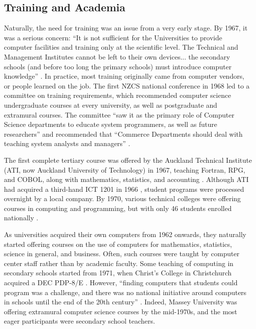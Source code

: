 \documentclass{IEEEcsmag}
\begin{document}
\subsection{Training and Academia}
\vspace*{5pt}
Naturally, the need for training was an issue from a very early stage. By 1967, it was a serious concern: “It is not sufficient for the Universities to provide computer facilities and training only at the scientific level. The Technical and Management Institutes cannot be left to their own devices... the secondary schools (and before too long the primary schools) must introduce computer knowledge” \cite{ScottSurvey1967}. In practice, most training originally came from computer vendors, or people learned on the job. The first NZCS national conference in 1968 led to a committee on training requirements, which recommended computer science undergraduate courses at every university, as well as postgraduate and extramural courses. The committee “saw it as the primary role of Computer Science departments to educate system programmers, as well as future researchers” and recommended that “Commerce Departments should deal with teaching system analysts and managers” \cite{Otago-history}.

The first complete tertiary course was offered by the Auckland Technical Institute (ATI, now Auckland University of Technology) in 1967, teaching Fortran, RPG, and COBOL, along with mathematics, statistics, and accounting \cite{Bell}. Although ATI had acquired a third-hand ICT 1201 in 1966 \cite{FirstCinNZ}, student programs were processed overnight by a local company. By 1970, various technical colleges were offering courses in computing and programming, but with only 46 students enrolled nationally \cite{Yearbook73}.

As universities acquired their own computers from 1962 onwards, they naturally started offering courses on the use of computers for mathematics, statistics, science in general, and business. Often, such courses were taught by computer center staff rather than by academic faculty. Some teaching of computing in secondary schools started from 1971, when Christ’s College in Christchurch acquired a DEC PDP-8/E \cite{Stratford-06}. However, “finding computers that students could program was a challenge, and there was no national initiative around computers in schools until the end of the 20th century” \cite{Bell}. Indeed, Massey University was offering extramural computer science courses by the mid-1970s, and the most eager participants were secondary school teachers.
\end{document}
